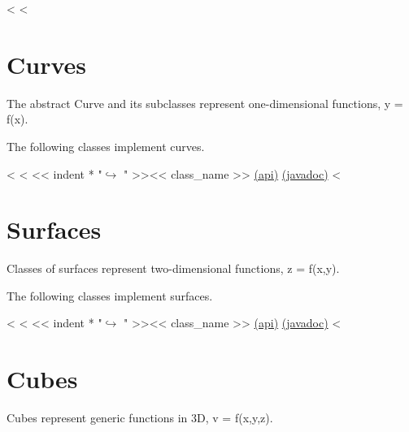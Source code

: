 <%
<%

\section{Curves}

The abstract Curve and its subclasses represent one-dimensional functions, y = f(x).

The following classes implement curves.

\begin{fullwidth}
<%
<%
<< indent * "$\hookrightarrow$ " >><< class_name >> \href{http://docs-static.opengamma.com/<< OG_VERSION >>/analytics/api/<< package_name >>.html#class-<<class_name>>}{(api)} \href{http://docs-static.opengamma.com/<< OG_VERSION >>/java/javadocs/<< class_name.replace(".","/") >>.html}{(javadoc)}
<%
\end{fullwidth}



\section{Surfaces}

Classes of surfaces represent two-dimensional functions, z = f(x,y).

The following classes implement surfaces.

\begin{fullwidth}
<%
<%
<< indent * "$\hookrightarrow$ " >><< class_name >> \href{http://docs-static.opengamma.com/<< OG_VERSION >>/analytics/api/<< package_name >>.html#class-<<class_name>>}{(api)} \href{http://docs-static.opengamma.com/<< OG_VERSION >>/java/javadocs/<< class_name.replace(".","/") >>.html}{(javadoc)}
<%
\end{fullwidth}

\section{Cubes}

Cubes represent generic functions in 3D, v = f(x,y,z).


